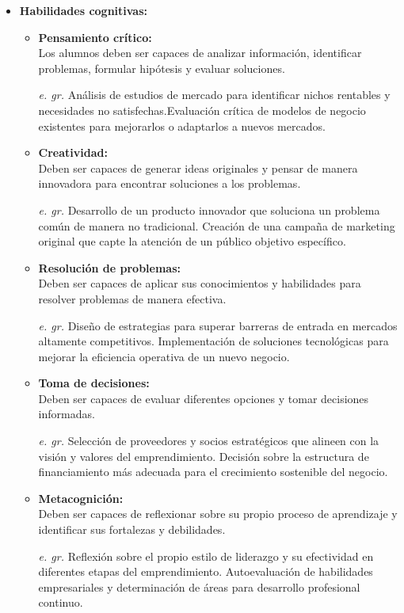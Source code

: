 \begin{itemize}
    \item \textbf{Habilidades cognitivas:}
    \begin{itemize}
        \item \textbf{Pensamiento crítico:}\\
        Los alumnos deben ser capaces de analizar información, identificar problemas, formular hipótesis y evaluar soluciones.
        \item[\textit{e. gr.}]Análisis de estudios de mercado para identificar nichos rentables y necesidades no satisfechas.Evaluación crítica de modelos de negocio existentes para mejorarlos o adaptarlos a nuevos mercados.
        \item \textbf{Creatividad: }\\
        Deben ser capaces de generar ideas originales y pensar de manera innovadora para encontrar soluciones a los problemas.
        \item[\textit{e. gr.}]Desarrollo de un producto innovador que soluciona un problema común de manera no tradicional. Creación de una campaña de marketing original que capte la atención de un público objetivo específico.
        \item \textbf{Resolución de problemas:}\\
        Deben ser capaces de aplicar sus conocimientos y habilidades para resolver problemas de manera efectiva.
        \item[\textit{e. gr.}]Diseño de estrategias para superar barreras de entrada en mercados altamente competitivos. Implementación de soluciones tecnológicas para mejorar la eficiencia operativa de un nuevo negocio.
        \item \textbf{Toma de decisiones:} \\
        Deben ser capaces de evaluar diferentes opciones y tomar decisiones informadas.
        \item[\textit{e. gr.}]Selección de proveedores y socios estratégicos que alineen con la visión y valores del emprendimiento. Decisión sobre la estructura de financiamiento más adecuada para el crecimiento sostenible del negocio.
        \item \textbf{Metacognición:}\\
        Deben ser capaces de reflexionar sobre su propio proceso de aprendizaje y identificar sus fortalezas y debilidades.
         \item[\textit{e. gr.}]
        Reflexión sobre el propio estilo de liderazgo y su efectividad en diferentes etapas del emprendimiento. Autoevaluación de habilidades empresariales y determinación de áreas para desarrollo profesional continuo.

\end{itemize}
\end{itemize}
